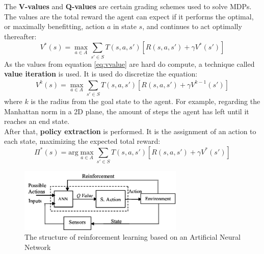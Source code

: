 \documentclass[a4paper]{article}
\begin{document}
	The \textbf{V-values} and \textbf{Q-values} are certain grading schemes used to solve MDPs. The values are the total reward the agent can expect if it performs the optimal, or maximally benefitting, action $a$ in state $s$, and continues to act optimally thereafter:
	\begin{equation}\label{eq:vvalue}
	V^*(s) = \max_{a \in A} \sum_{s' \in S}^{} T(s,a,s')[R(s,a,s')+\gamma V^*(s')]
	\end{equation}
	As the values from equation \ref{eq:vvalue} are hard do compute, a technique called \textbf{value iteration} is used. It is used do discretize the equation: 
	\begin{equation}\label{eq:value-iteration}
	V^k(s) = \max_{a \in A} \sum_{s' \in S}^{} T(s,a,s')[R(s,a,s')+\gamma V^{k-1}(s')]
	\end{equation}
	where $k$ is the radius from the goal state to the agent. For example, regarding the Manhattan norm in a 2D plane, the amount of steps the agent has left until it reaches an end state.\\
	After that, \textbf{policy extraction} is performed. It is the assignment of an action to each state, maximizing the expected total reward:
	\begin{equation}
	\Pi^*(s) = \text{arg}\max_{a \in A} \sum_{s' \in S}^{} T(s,a,s')[R(s,a,s')+\gamma V^*(s')]
	\end{equation}
	\begin{figure}[t]
		\centering
		\includegraphics[angle=0,width=0.7\textwidth]{./figs/RL_ANN.png}
		\caption{\label{fig:qlearn}The structure of reinforcement learning based on an Artificial Neural Network \citep{HatemRL}}
	\end{figure}
\end{document}
